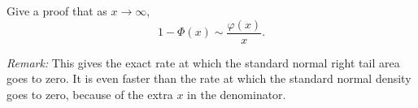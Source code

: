 \begin{problem}[Handout 14, \# 15]
  Give a proof that as \(x\to\infty\),
  \[
    1-\Phi(x)\sim\frac{\varphi(x)}{x}.
  \]

  \noindent \emph{Remark:} This gives the exact rate at which the standard
  normal right tail area goes to zero. It is even faster than the rate at
  which the standard normal density goes to zero, because of the extra
  \(x\) in the denominator.
\end{problem}
\begin{solution}

\end{solution}

